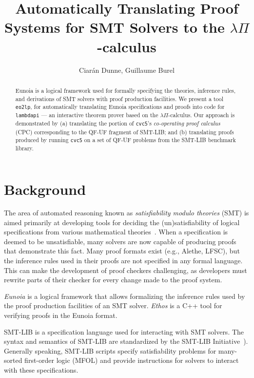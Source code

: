 \documentclass{article}
\title{
  Automatically Translating Proof Systems
  for SMT Solvers to the $\lambda\Pi$-calculus}
\author{Ciarán Dunne, Guillaume Burel}
\begin{document}
\maketitle

\begin{abstract}
	\noindent
	Eunoia is a logical framework used for formally specifying the
	theories, inference rules, and derivations of SMT solvers with
	proof production facilities.
	We present a tool \texttt{eo2lp}, for automatically translating Eunoia
	specifications and proofs into code for \texttt{lambdapi} ---
	an interactive theorem prover based on the $\lambda\Pi$-calculus.
	Our approach is demonstrated by
	(a) translating the portion of \texttt{cvc5}'s
	\textit{co-operating proof calculus} (CPC) corresponding to the QF-UF
	fragment of SMT-LIB; and
	(b) translating proofs produced by running \texttt{cvc5} on a set of
	QF-UF problems from the SMT-LIB benchmark library.
\end{abstract}

\section{Background}

The area of automated reasoning known as \emph{satisfiability modulo theories}
(SMT) is aimed primarily at developing tools for deciding the (un)satisfiability
of logical specifications from various mathematical theories~\cite{Barrett2021}.
%
When a specification is deemed to be unsatisfiable, many solvers are now capable
of producing proofs that demonstrate this fact.
%
Many proof formats exist (e.g., Alethe, LFSC), but the inference rules used
in their proofs are not specified in any formal language.
%
This can make the development of proof checkers challenging, as developers
must rewrite parts of their checker for every change made to the proof system.

\textit{Eunoia} is a logical framework that allows formalizing the inference
rules used by the proof production facilities of an SMT solver.
%
\textit{Ethos} is a C++ tool for verifying proofs in the Eunoia format.

SMT-LIB is a specification language used for interacting with SMT solvers.
The syntax and semantics of SMT-LIB are standardized by the
SMT-LIB Initiative~\autocite{Barrett2015-standard}).
%
Generally speaking, SMT-LIB scripts specify satisfiability problems for
many-sorted first-order logic (MFOL) and provide instructions for solvers
to interact with these specifications.
\end{document}
